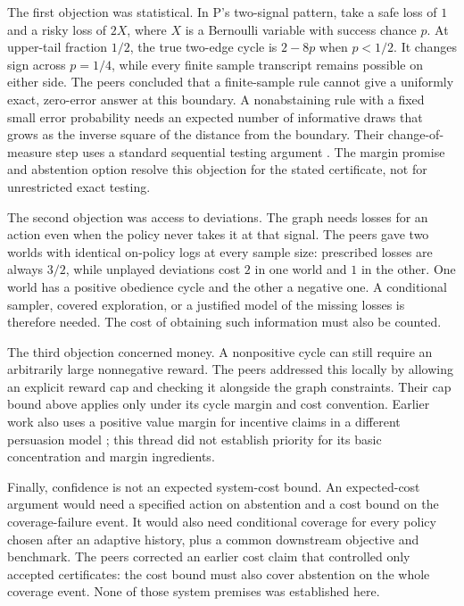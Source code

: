 \documentclass{article}
\begin{document}
The first objection was statistical. In P's two-signal pattern, take a safe loss of \(1\) and a
risky loss of \(2X\), where \(X\) is a Bernoulli variable with success chance \(p\). At upper-tail
fraction \(1/2\), the true two-edge cycle is \(2-8p\) when \(p<1/2\). It changes sign across
\(p=1/4\), while every finite sample transcript remains possible on either side. The peers concluded
that a finite-sample rule cannot give a uniformly exact, zero-error answer at this boundary. A
nonabstaining rule with a fixed small error probability needs an expected number of informative
draws that grows as the inverse square of the distance from the boundary. Their change-of-measure
step uses a standard sequential testing argument \cite{klsource}. The margin promise and abstention
option resolve this objection for the stated certificate, not for unrestricted exact testing.

The second objection was access to deviations. The graph needs losses for an action even when the
policy never takes it at that signal. The peers gave two worlds with identical on-policy logs at
every sample size: prescribed losses are always \(3/2\), while unplayed deviations cost \(2\) in one
world and \(1\) in the other. One world has a positive obedience cycle and the other a negative one.
A conditional sampler, covered exploration, or a justified model of the missing losses is therefore
needed. The cost of obtaining such information must also be counted.

The third objection concerned money. A nonpositive cycle can still require an arbitrarily large
nonnegative reward. The peers addressed this locally by allowing an explicit reward cap and checking
it alongside the graph constraints. Their cap bound above applies only under its cycle margin and
cost convention. Earlier work also uses a positive value margin for incentive claims in a different
persuasion model \cite{persuasion}; this thread did not establish priority for its basic
concentration and margin ingredients.

Finally, confidence is not an expected system-cost bound. An expected-cost argument would need a
specified action on abstention and a cost bound on the coverage-failure event. It would also need
conditional coverage for every policy chosen after an adaptive history, plus a common downstream
objective and benchmark. The peers corrected an earlier cost claim that controlled only accepted
certificates: the cost bound must also cover abstention on the whole coverage event. None of those
system premises was established here.
\end{document}
